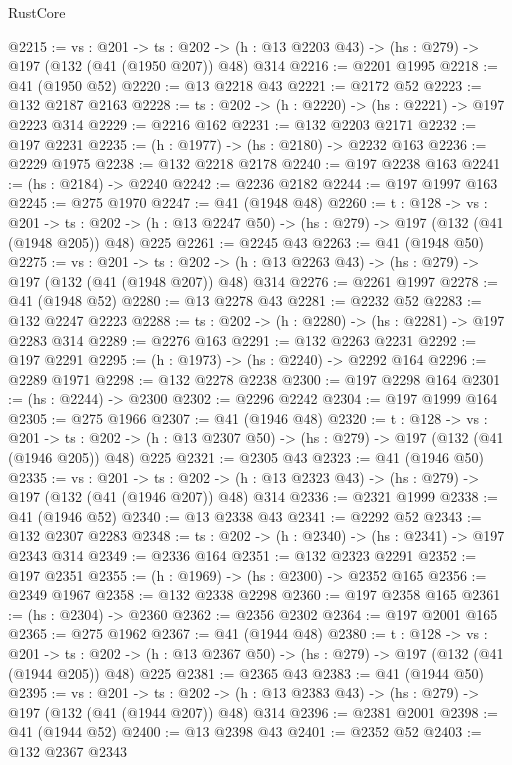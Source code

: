 \begin{lexlean}{RustCore}
\begin{coremodule}
@2215 := {vs : @201} ->
  {ts : @202} -> (h : @13 @2203 @43) -> (hs : @279) -> @197 (@132 (@41 (@1950 @207)) @48) @314
@2216 := @2201 @1995
@2218 := @41 (@1950 @52)
@2220 := @13 @2218 @43
@2221 := @2172 @52
@2223 := @132 @2187 @2163
@2228 := {ts : @202} -> (h : @2220) -> (hs : @2221) -> @197 @2223 @314
@2229 := @2216 @162
@2231 := @132 @2203 @2171
@2232 := @197 @2231
@2235 := (h : @1977) -> (hs : @2180) -> @2232 @163
@2236 := @2229 @1975
@2238 := @132 @2218 @2178
@2240 := @197 @2238 @163
@2241 := (hs : @2184) -> @2240
@2242 := @2236 @2182
@2244 := @197 @1997 @163
@2245 := @275 @1970
@2247 := @41 (@1948 @48)
@2260 := {t : @128} ->
  {vs : @201} ->
  {ts : @202} -> (h : @13 @2247 @50) -> (hs : @279) -> @197 (@132 (@41 (@1948 @205)) @48) @225
@2261 := @2245 @43
@2263 := @41 (@1948 @50)
@2275 := {vs : @201} ->
  {ts : @202} -> (h : @13 @2263 @43) -> (hs : @279) -> @197 (@132 (@41 (@1948 @207)) @48) @314
@2276 := @2261 @1997
@2278 := @41 (@1948 @52)
@2280 := @13 @2278 @43
@2281 := @2232 @52
@2283 := @132 @2247 @2223
@2288 := {ts : @202} -> (h : @2280) -> (hs : @2281) -> @197 @2283 @314
@2289 := @2276 @163
@2291 := @132 @2263 @2231
@2292 := @197 @2291
@2295 := (h : @1973) -> (hs : @2240) -> @2292 @164
@2296 := @2289 @1971
@2298 := @132 @2278 @2238
@2300 := @197 @2298 @164
@2301 := (hs : @2244) -> @2300
@2302 := @2296 @2242
@2304 := @197 @1999 @164
@2305 := @275 @1966
@2307 := @41 (@1946 @48)
@2320 := {t : @128} ->
  {vs : @201} ->
  {ts : @202} -> (h : @13 @2307 @50) -> (hs : @279) -> @197 (@132 (@41 (@1946 @205)) @48) @225
@2321 := @2305 @43
@2323 := @41 (@1946 @50)
@2335 := {vs : @201} ->
  {ts : @202} -> (h : @13 @2323 @43) -> (hs : @279) -> @197 (@132 (@41 (@1946 @207)) @48) @314
@2336 := @2321 @1999
@2338 := @41 (@1946 @52)
@2340 := @13 @2338 @43
@2341 := @2292 @52
@2343 := @132 @2307 @2283
@2348 := {ts : @202} -> (h : @2340) -> (hs : @2341) -> @197 @2343 @314
@2349 := @2336 @164
@2351 := @132 @2323 @2291
@2352 := @197 @2351
@2355 := (h : @1969) -> (hs : @2300) -> @2352 @165
@2356 := @2349 @1967
@2358 := @132 @2338 @2298
@2360 := @197 @2358 @165
@2361 := (hs : @2304) -> @2360
@2362 := @2356 @2302
@2364 := @197 @2001 @165
@2365 := @275 @1962
@2367 := @41 (@1944 @48)
@2380 := {t : @128} ->
  {vs : @201} ->
  {ts : @202} -> (h : @13 @2367 @50) -> (hs : @279) -> @197 (@132 (@41 (@1944 @205)) @48) @225
@2381 := @2365 @43
@2383 := @41 (@1944 @50)
@2395 := {vs : @201} ->
  {ts : @202} -> (h : @13 @2383 @43) -> (hs : @279) -> @197 (@132 (@41 (@1944 @207)) @48) @314
@2396 := @2381 @2001
@2398 := @41 (@1944 @52)
@2400 := @13 @2398 @43
@2401 := @2352 @52
@2403 := @132 @2367 @2343

\end{coremodule}
\end{lexlean}

